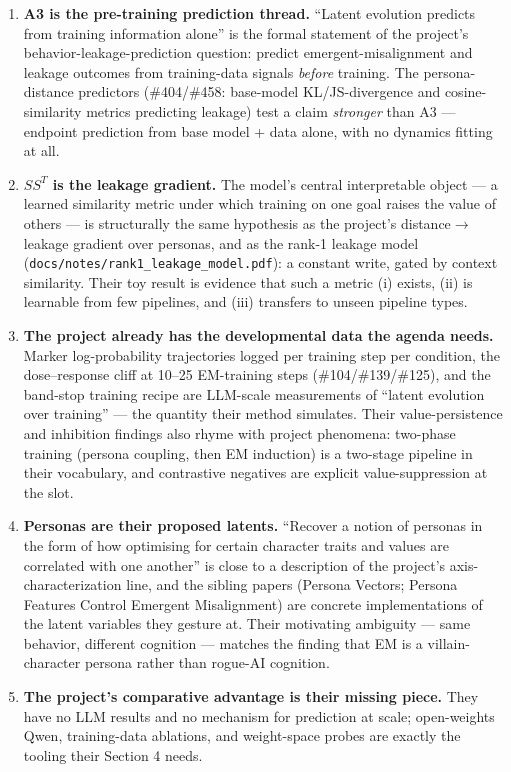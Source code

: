 \documentclass[11pt]{article}
\begin{document}
\begin{enumerate}[itemsep=6pt]

\item \textbf{A3 is the pre-training prediction thread.} ``Latent evolution predicts from training information alone'' is the formal statement of the project's behavior-leakage-prediction question: predict emergent-misalignment and leakage outcomes from training-data signals \emph{before} training. The persona-distance predictors (\#404/\#458: base-model KL/JS-divergence and cosine-similarity metrics predicting leakage) test a claim \emph{stronger} than A3 --- endpoint prediction from base model + data alone, with no dynamics fitting at all.

\item \textbf{$SS^{T}$ is the leakage gradient.} The model's central interpretable object --- a learned similarity metric under which training on one goal raises the value of others --- is structurally the same hypothesis as the project's distance$\to$leakage gradient over personas, and as the rank-1 leakage model (\texttt{docs/notes/rank1\_leakage\_model.pdf}): a constant write, gated by context similarity. Their toy result is evidence that such a metric (i) exists, (ii) is learnable from few pipelines, and (iii) transfers to unseen pipeline types.

\item \textbf{The project already has the developmental data the agenda needs.} Marker log-probability trajectories logged per training step per condition, the dose--response cliff at 10--25 EM-training steps (\#104/\#139/\#125), and the band-stop training recipe are LLM-scale measurements of ``latent evolution over training'' --- the quantity their method simulates. Their value-persistence and inhibition findings also rhyme with project phenomena: two-phase training (persona coupling, then EM induction) is a two-stage pipeline in their vocabulary, and contrastive negatives are explicit value-suppression at the slot.

\item \textbf{Personas are their proposed latents.} ``Recover a notion of personas in the form of how optimising for certain character traits and values are correlated with one another'' is close to a description of the project's axis-characterization line, and the sibling papers (Persona Vectors; Persona Features Control Emergent Misalignment) are concrete implementations of the latent variables they gesture at. Their motivating ambiguity --- same behavior, different cognition --- matches the finding that EM is a villain-character persona rather than rogue-AI cognition.

\item \textbf{The project's comparative advantage is their missing piece.} They have no LLM results and no mechanism for prediction at scale; open-weights Qwen, training-data ablations, and weight-space probes are exactly the tooling their Section 4 needs.

\end{enumerate}
\end{document}
